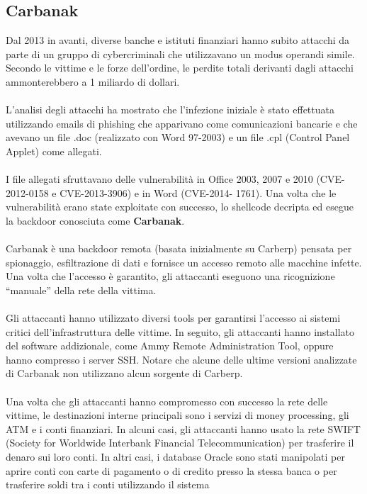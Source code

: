 \documentclass[8pt]{extarticle}
\begin{document}
\subsection{Carbanak}
\noindent
Dal 2013 in avanti, diverse banche e istituti finanziari hanno subito attacchi da parte di un gruppo 
di cybercriminali che utilizzavano un modus operandi simile. Secondo le vittime e le forze dell’ordine, 
le perdite totali derivanti dagli attacchi ammonterebbero a 1 miliardo di dollari. \\\\
L’analisi degli attacchi ha mostrato che l’infezione iniziale è stato effettuata utilizzando emails di 
phishing che apparivano come comunicazioni bancarie e che avevano un file .doc (realizzato con Word 97-2003) 
e un file .cpl (Control Panel Applet) come allegati.\\\\
I file allegati sfruttavano delle vulnerabilità in Office 2003, 2007 e 2010 (CVE-2012-0158 e CVE-2013-3906) 
e in Word (CVE-2014- 1761). Una volta che le vulnerabilità erano state exploitate con successo, lo 
shellcode decripta ed esegue la backdoor conosciuta come \textbf{Carbanak}.\\\\
Carbanak è una backdoor remota (basata inizialmente su Carberp) pensata per spionaggio, esfiltrazione 
di dati e fornisce un accesso remoto alle macchine infette. Una volta che l’accesso è garantito, gli 
attaccanti eseguono una ricognizione “manuale” della rete della vittima.\\\\
Gli attaccanti hanno utilizzato diversi tools per garantirsi l’accesso ai sistemi critici 
dell’infrastruttura delle vittime. In seguito, gli attaccanti hanno installato del software addizionale, 
come Ammy Remote Administration Tool, oppure hanno compresso i server SSH. Notare che alcune delle ultime 
versioni analizzate di Carbanak non utilizzano alcun sorgente di Carberp.\\\\
Una volta che gli attaccanti hanno compromesso con successo la rete delle vittime, le destinazioni interne 
principali sono i servizi di money processing, gli ATM e i conti finanziari. In alcuni casi, gli attaccanti 
hanno usato la rete SWIFT (Society for Worldwide Interbank Financial Telecommunication) per trasferire il 
denaro sui loro conti. In altri casi, i database Oracle sono stati manipolati per aprire conti con carte 
di pagamento o di credito presso la stessa banca o per trasferire soldi tra i conti utilizzando il sistema 
\end{document}
